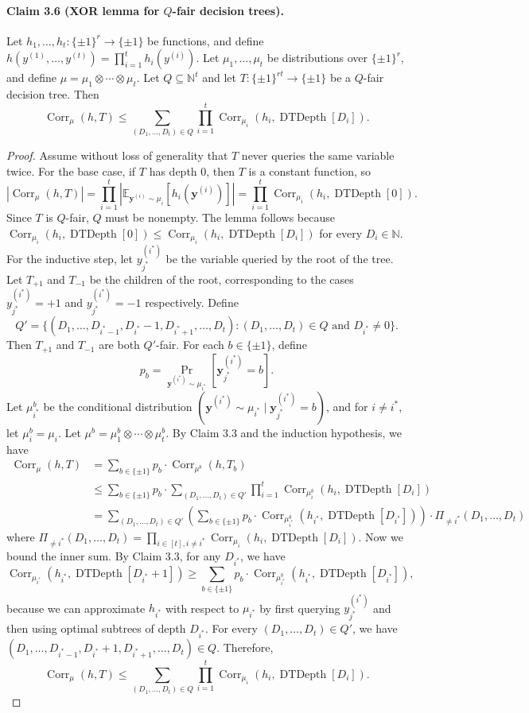 \documentclass[10pt,a4paper]{article}
\newcommand{\Corr}{\operatorname{Corr}}
\newcommand{\DT}{\operatorname{DTDepth}}
\begin{document}
\paragraph{Claim 3.6 (XOR lemma for $Q$-fair decision trees).} Let $h_1,\ldots,h_t:\{\pm1\}^r\to\{\pm1\}$ be functions, and define $h(y^{(1)},\ldots,y^{(t)})=\prod_{i=1}^t h_i(y^{(i)})$. Let $\mu_1,\ldots,\mu_t$ be distributions over $\{\pm1\}^r$, and define $\mu=\mu_1\otimes\cdots\otimes\mu_t$. Let $Q\subseteq\mathbb N^t$ and let $T:\{\pm1\}^{rt}\to\{\pm1\}$ be a $Q$-fair decision tree. Then
\[\Corr_\mu(h,T)\le\sum_{(D_1,\ldots,D_t)\in Q}\prod_{i=1}^t\Corr_{\mu_i}(h_i,\DT[D_i]).\]
\begin{proof}
Assume without loss of generality that $T$ never queries the same variable twice. For the base case, if $T$ has depth 0, then $T$ is a constant function, so
\[|\Corr_\mu(h,T)|=\prod_{i=1}^t\left|\mathbb E_{\mathbf y^{(i)}\sim\mu_i}[h_i(\mathbf y^{(i)})]\right|=\prod_{i=1}^t\Corr_{\mu_i}(h_i,\DT[0]).\]
Since $T$ is $Q$-fair, $Q$ must be nonempty. The lemma follows because $\Corr_{\mu_i}(h_i,\DT[0])\le\Corr_{\mu_i}(h_i,\DT[D_i])$ for every $D_i\in\mathbb N$. For the inductive step, let $y_{j^*}^{(i^*)}$ be the variable queried by the root of the tree. Let $T_{+1}$ and $T_{-1}$ be the children of the root, corresponding to the cases $y_{j^*}^{(i^*)}=+1$ and $y_{j^*}^{(i^*)}=-1$ respectively. Define
\[Q'=\{(D_1,\ldots,D_{i^*-1},D_{i^*}-1,D_{i^*+1},\ldots,D_t):(D_1,\ldots,D_t)\in Q\text{ and }D_{i^*}\ne0\}.\]
Then $T_{+1}$ and $T_{-1}$ are both $Q'$-fair.
For each $b\in\{\pm1\}$, define
\[p_b=\Pr_{\mathbf y^{(i^*)}\sim\mu_{i^*}}[\mathbf y_{j^*}^{(i^*)}=b].\]
Let $\mu_{i^*}^b$ be the conditional distribution $(\mathbf y^{(i^*)}\sim\mu_{i^*}\mid\mathbf y_{j^*}^{(i^*)}=b)$, and for $i\ne i^*$, let $\mu_i^b=\mu_i$. Let $\mu^b=\mu_1^b\otimes\cdots\otimes\mu_t^b$. By Claim 3.3 and the induction hypothesis, we have
\begin{align*}
\Corr_\mu(h,T)&=\sum_{b\in\{\pm1\}}p_b\cdot\Corr_{\mu^b}(h,T_b)\\
&\le\sum_{b\in\{\pm1\}}p_b\cdot\sum_{(D_1,\ldots,D_t)\in Q'}\prod_{i=1}^t\Corr_{\mu_i^b}(h_i,\DT[D_i])\\
&=\sum_{(D_1,\ldots,D_t)\in Q'}\left(\sum_{b\in\{\pm1\}}p_b\cdot\Corr_{\mu_{i^*}^b}(h_{i^*},\DT[D_{i^*}])\right)\cdot\Pi_{\ne i^*}(D_1,\ldots,D_t)
\end{align*}
where $\Pi_{\ne i^*}(D_1,\ldots,D_t)=\prod_{i\in[t],i\ne i^*}\Corr_{\mu_i}(h_i,\DT[D_i])$. Now we bound the inner sum. By Claim 3.3, for any $D_{i^*}$, we have
\[\Corr_{\mu_{i^*}}(h_{i^*},\DT[D_{i^*}+1])\ge\sum_{b\in\{\pm1\}}p_b\cdot\Corr_{\mu_{i^*}^b}(h_{i^*},\DT[D_{i^*}]),\]
because we can approximate $h_{i^*}$ with respect to $\mu_{i^*}$ by first querying $y_{j^*}^{(i^*)}$ and then using optimal subtrees of depth $D_{i^*}$. For every $(D_1,\ldots,D_t)\in Q'$, we have $(D_1,\ldots,D_{i^*-1},D_{i^*}+1,D_{i^*+1},\ldots,D_t)\in Q$. Therefore,
\[\Corr_\mu(h,T)\le\sum_{(D_1,\ldots,D_t)\in Q}\prod_{i=1}^t\Corr_{\mu_i}(h_i,\DT[D_i]).\]
\end{proof}
\end{document}
